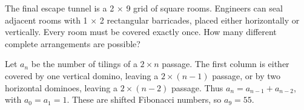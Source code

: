 The final escape tunnel is a 2 $\times$ 9 grid of square rooms. Engineers can seal adjacent rooms with 1 $\times$ 2 rectangular barricades, placed either horizontally or vertically. Every room must be covered exactly once. How many different complete arrangements are possible?

\begin{solution}
Let $a_n$ be the number of tilings of a $2\times n$ passage. The first
column is either covered by one vertical domino, leaving a $2\times(n-1)$
passage, or by two horizontal dominoes, leaving a $2\times(n-2)$ passage.
Thus $a_n=a_{n-1}+a_{n-2}$, with $a_0=a_1=1$.
These are shifted Fibonacci numbers, so
$\boxed{a_9=55}.$
\end{solution}
